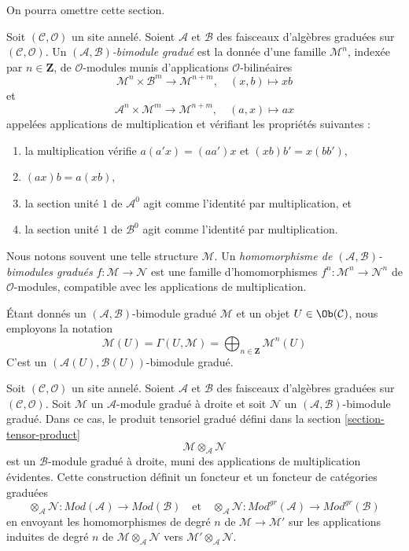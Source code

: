 \noindent
On pourra omettre cette section.

\begin{definition}
\label{definition-bimodule}
Soit $(\mathcal{C}, \mathcal{O})$ un site annelé. Soient $\mathcal{A}$ et
$\mathcal{B}$ des faisceaux d'algèbres graduées sur
$(\mathcal{C}, \mathcal{O})$. Un
{\it $(\mathcal{A}, \mathcal{B})$-bimodule gradué} est la
donnée d'une famille $\mathcal{M}^n$, indexée par $n \in \mathbf{Z}$, de
$\mathcal{O}$-modules munis d'applications $\mathcal{O}$-bilinéaires
$$
\mathcal{M}^n \times \mathcal{B}^m \to \mathcal{M}^{n + m},\quad (x,
b) \longmapsto xb
$$
et
$$
\mathcal{A}^n \times \mathcal{M}^m \to \mathcal{M}^{n + m},\quad (a, x)
\longmapsto ax
$$ appelées
applications de multiplication et vérifiant les propriétés
suivantes : \begin{enumerate}
\item la multiplication vérifie $a(a'x) = (aa')x$
et $(xb)b' = x(bb')$,
\item $(ax)b = a(xb)$,
\item la section unité $1$ de $\mathcal{A}^0$ agit comme
l'identité par multiplication, et
\item la section unité $1$ de
$\mathcal{B}^0$ agit comme l'identité par multiplication.
\end{enumerate} Nous notons
souvent une telle structure $\mathcal{M}$. Un
{\it homomorphisme de $(\mathcal{A}, \mathcal{B})$-bimodules gradués}
$f : \mathcal{M} \to \mathcal{N}$ est une famille d'homomorphismes
$f^n : \mathcal{M}^n \to \mathcal{N}^n$ de
$\mathcal{O}$-modules, compatible avec les applications de multiplication.
\end{definition}

\noindent
Étant donnés un $(\mathcal{A}, \mathcal{B})$-bimodule gradué $\mathcal{M}$
et un objet $U \in \Ob(\mathcal{C})$, nous employons la
notation $$
\mathcal{M}(U)
= \Gamma(U, \mathcal{M})
= \bigoplus\nolimits_{n \in \mathbf{Z}} \mathcal{M}^n(U)
$$
C'est un $(\mathcal{A}(U), \mathcal{B}(U))$-bimodule gradué.

\medskip\noindent
Soit $(\mathcal{C}, \mathcal{O})$ un site annelé. Soient $\mathcal{A}$ et
$\mathcal{B}$ des faisceaux d'algèbres graduées sur
$(\mathcal{C}, \mathcal{O})$. Soit $\mathcal{M}$ un
$\mathcal{A}$-module gradué à droite et soit $\mathcal{N}$ un
$(\mathcal{A}, \mathcal{B})$-bimodule gradué. Dans ce cas, le produit tensoriel
gradué défini dans la section \ref{section-tensor-product}
$$
\mathcal{M} \otimes_\mathcal{A} \mathcal{N}
$$ est un
$\mathcal{B}$-module gradué à droite, muni des applications de multiplication évidentes.
Cette construction définit un foncteur et un foncteur de catégories
graduées $$
\otimes_\mathcal{A} \mathcal{N}
: \textit{Mod}(\mathcal{A})
\longrightarrow
\textit{Mod}(\mathcal{B})
\quad\text{et}\quad
\otimes_\mathcal{A} \mathcal{N} :
\textit{Mod}^{gr}(\mathcal{A})
\longrightarrow
\textit{Mod}^{gr}(\mathcal{B})
$$
en envoyant les homomorphismes de degré $n$ de $\mathcal{M} \to \mathcal{M}'$ sur
les applications induites de degré $n$
de $\mathcal{M} \otimes_\mathcal{A} \mathcal{N}$
vers $\mathcal{M}' \otimes_\mathcal{A} \mathcal{N}$.

